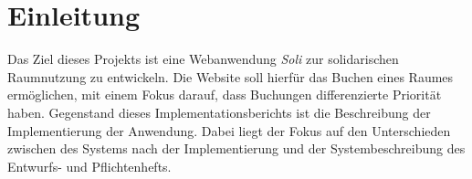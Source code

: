 
\chapter{Einleitung}
\label{ch:preface}


Das Ziel dieses Projekts ist eine Webanwendung \textit{Soli} zur solidarischen Raumnutzung zu entwickeln.
Die Website soll hierfür das Buchen eines Raumes ermöglichen, mit einem Fokus darauf, dass Buchungen differenzierte Priorität haben.
Gegenstand dieses Implementationsberichts ist die Beschreibung der Implementierung der Anwendung.
Dabei liegt der Fokus auf den Unterschieden zwischen des Systems nach der Implementierung und der Systembeschreibung des Entwurfs- und Pflichtenhefts.